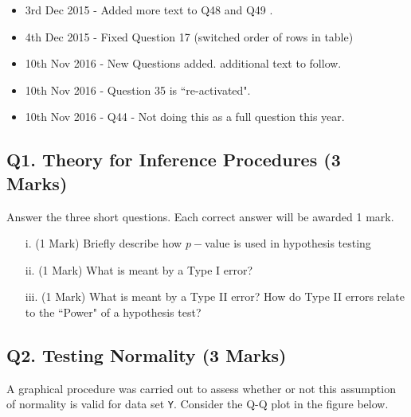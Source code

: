 \documentclass[a4paper,12pt]{article}
\begin{document}
\begin{itemize}
	\item 3rd Dec 2015 - Added more text to Q48 and Q49 .
	\item 4th Dec 2015 - Fixed Question 17 (switched order of rows in table)
	\item 10th Nov 2016 - New Questions added. additional text to follow.
	\item 10th Nov 2016 - Question 35 is ``re-activated".
	\item 10th Nov 2016 - Q44 - Not doing this as a full question this year.
\end{itemize}
\newpage
\subsection*{Q1. Theory for Inference Procedures (3 Marks)}
Answer the three short questions. Each correct answer will be awarded 1 mark.
\begin{itemize}
\item[i.] (1 Mark) Briefly describe how $p-$value is used in hypothesis testing
\item[ii.] (1 Mark) What is meant by a Type I error?
\item[iii.] (1 Mark) What is meant by a Type II error? How do Type II errors relate to the ``Power" of a hypothesis test?
\end{itemize}
%

\subsection*{Q2. Testing Normality (3 Marks)} %
A graphical procedure was carried out to assess whether or not this assumption of normality is valid for data set \texttt{Y}. Consider the Q-Q plot in the figure below.
\end{document}
